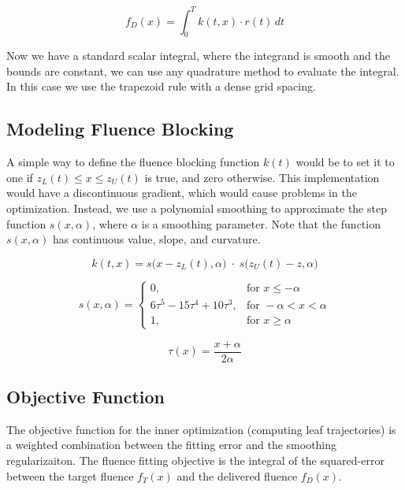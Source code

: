\begin{equation}
  f_D(x) = \int_0^T \! k(t, x) \cdot r(t) \, dt
\end{equation}

Now we have a standard scalar integral, where the integrand is smooth and the
bounds are constant, we can use any quadrature method to evaluate the integral.
In this case we use the trapezoid rule with a dense grid spacing.

\subsection{Modeling Fluence Blocking}
\label{sec:modelingFluenceBlocking}

A simple way to define the fluence blocking function $k(t)$
would be to set it to one if $z_L(t) \leq x \leq z_U(t)$
is true, and zero otherwise.
This implementation would have a discontinuous gradient, which would cause problems in the optimization.
Instead, we use a polynomial smoothing to approximate the step function $s(x,\alpha)$,
where $\alpha$ is a smoothing parameter.
Note that the function $s(x,\alpha)$ has continuous value, slope, and curvature.

\begin{equation}
  k(t, x) = s\big(x - z_L(t), \alpha\big) \; \cdot \; s\big(z_U(t) - z, \alpha\big)
\end{equation}

\begin{equation}
  s(x, \alpha) =
    \begin{cases}
      0, & \text{for } x \leq -\alpha \\
      6\tau^5-15\tau^4+10\tau^3, & \text{for }  -\alpha < x < \alpha\\
      1, & \text{for } x \geq \alpha
    \end{cases}
\end{equation}

\begin{equation}
  \tau(x) = \frac{x + \alpha}{2\alpha}
\end{equation}

\subsection{Objective Function}

The objective function for the inner optimization (computing leaf trajectories)
is a weighted combination between the fitting error and the smoothing regularizaiton.
The fluence fitting objective is the integral of the squared-error
between the target fluence $f_T(x)$ and the delivered fluence $f_D(x)$.


